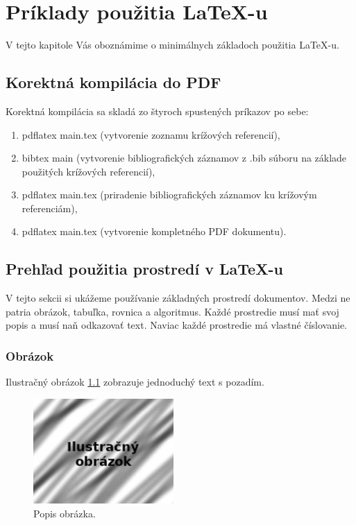 \chapter{Príklady použitia \LaTeX -u}
V tejto kapitole Vás oboznámime o minimálnych základoch použitia \LaTeX -u.

\section*{Korektná kompilácia do PDF}
Korektná kompilácia sa skladá zo štyroch spustených príkazov po sebe:
\begin{enumerate}
	\item pdflatex main.tex (vytvorenie zoznamu krížových referencií),
	\item bibtex main (vytvorenie bibliografických záznamov z .bib súboru na základe použitých krížových referencií),
	\item pdflatex main.tex (priradenie bibliografických záznamov ku krížovým referenciám),
	\item pdflatex main.tex (vytvorenie kompletného PDF dokumentu).
\end{enumerate}

\section*{Prehľad použitia prostredí v \LaTeX -u}
V tejto sekcii si ukážeme používanie základných prostredí dokumentov. Medzi ne patria obrázok, tabuľka, rovnica a algoritmus. Každé prostredie musí mať svoj popis a musí naň odkazovať text. Naviac každé prostredie má vlastné číslovanie.

\subsection*{Obrázok}
Ilustračný obrázok \ref{pic-reference} zobrazuje jednoduchý text s pozadím.

\begin{figure}[H]
	\begin{center}
		\includegraphics[height=4cm]{pics/picture.jpg}
		\caption{Popis obrázka.}
		\label{pic-reference}
	\end{center}
\end{figure}


